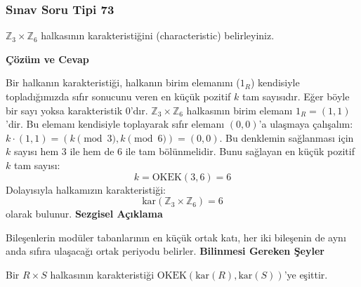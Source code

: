 \documentclass[11pt, a4paper]{article}
\newenvironment{cozum}{
    \vspace{0.5cm}
    \noindent\textcolor{green!60!black}{\faCheckCircle\enspace \textbf{\Large Çözüm ve Cevap}}\par\vspace{0.2cm}
}{}
\newenvironment{sezgisel}{
    \vspace{0.5cm}
    \noindent\textcolor{orange!80!black}{\faLightbulb\enspace \textbf{\Large Sezgisel Açıklama}}\par\vspace{0.2cm}
    \itshape
}{}
\newenvironment{bilgi}{
    \vspace{0.5cm}
    \noindent\textcolor{red!70!black}{\faExclamationTriangle\enspace \textbf{\Large Bilinmesi Gereken Şeyler}}\par\vspace{0.2cm}
}{}
\begin{document}
\subsubsection{Sınav Soru Tipi 73}
\begin{sinavbox}
$\mathbb{Z}_{3} \times \mathbb{Z}_{6}$ halkasının karakteristiğini (characteristic) belirleyiniz.
\end{sinavbox}
\begin{cozum}
Bir halkanın karakteristiği, halkanın birim elemanını ($1_R$) kendisiyle topladığımızda sıfır sonucunu veren en küçük pozitif $k$ tam sayısıdır. Eğer böyle bir sayı yoksa karakteristik 0'dır.
$\mathbb{Z}_3 \times \mathbb{Z}_6$ halkasının birim elemanı $1_R = (1, 1)$'dir.
Bu elemanı kendisiyle toplayarak sıfır elemanı $(0, 0)$'a ulaşmaya çalışalım:
$k \cdot (1, 1) = (k \pmod 3, k \pmod 6) = (0, 0)$.
Bu denklemin sağlanması için $k$ sayısı hem 3 ile hem de 6 ile tam bölünmelidir.
Bunu sağlayan en küçük pozitif $k$ tam sayısı:
\[ k = \text{OKEK}(3, 6) = 6 \]
Dolayısıyla halkamızın karakteristiği:
\[ \text{kar}(\mathbb{Z}_3 \times \mathbb{Z}_6) = 6 \]
olarak bulunur.
\end{cozum}
\begin{sezgisel}
Bileşenlerin modüler tabanlarının en küçük ortak katı, her iki bileşenin de aynı anda sıfıra ulaşacağı ortak periyodu belirler.
\end{sezgisel}
\begin{bilgi}
Bir $R \times S$ halkasının karakteristiği $\text{OKEK}(\text{kar}(R), \text{kar}(S))$'ye eşittir.
\end{bilgi}

\newpage
\end{document}
